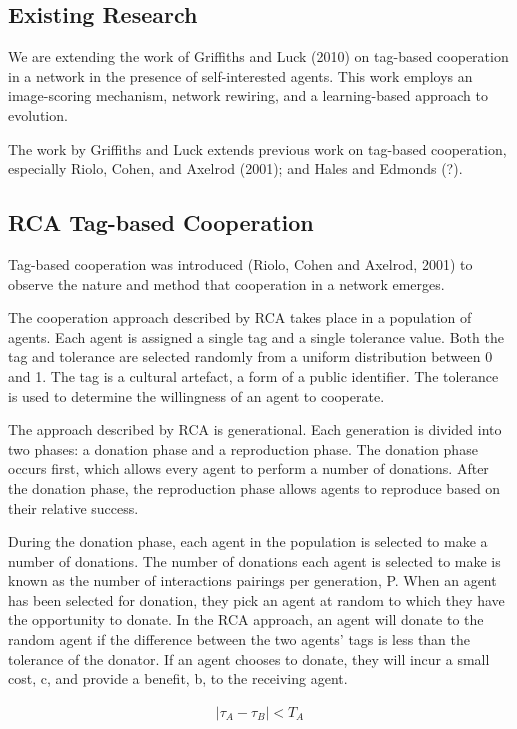\subsection{Existing Research}

We are extending the work of Griffiths and Luck (2010) on tag-based
cooperation in a network in the presence of self-interested agents.
This work employs an image-scoring mechanism, network rewiring, and
a learning-based approach to evolution.

The work by Griffiths and Luck extends previous work on tag-based
cooperation, especially Riolo, Cohen, and Axelrod (2001); and Hales
and Edmonds (?).

\subsection{RCA Tag-based Cooperation}

Tag-based cooperation was introduced (Riolo, Cohen and Axelrod,
2001) to observe the nature and method that cooperation in a network
emerges.

The cooperation approach described by RCA takes place in a population
of agents.  Each agent is assigned a single tag and a single tolerance
value.  Both the tag and tolerance are selected randomly from a
uniform distribution between 0 and 1.
The tag is a cultural artefact, a form of a public identifier.
The tolerance is used to determine the willingness of an agent to cooperate.

The approach described by RCA is generational.  Each generation is
divided into two phases: a donation phase and a reproduction phase.
The donation phase occurs first, which allows every agent to perform
a number of donations.  After the donation phase, the reproduction
phase allows agents to reproduce based on their relative success.

During the donation phase, each agent in the population is selected
to make a number of donations.  The number of donations each agent
is selected to make is known as the number of interactions pairings
per generation, P.  When an agent has been selected for donation,
they pick an agent at random to which they have the opportunity to
donate.  In the RCA approach, an agent will donate to the random
agent if the difference between the two agents' tags is less than
the tolerance of the donator.  If an agent chooses to donate, they
will incur a small cost, c, and provide a benefit, b, to the receiving
agent.

\begin{align*}
    |\tau_A - \tau_B| < T_A
\end{align*}

